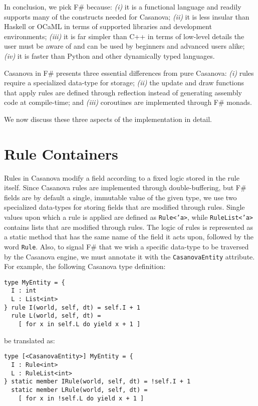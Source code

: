 In conclusion, we pick F\# because: \textit{(i)} it is a functional language and readily supports many of the constructs needed for Casanova; \textit{(ii)} it is less insular than Haskell or OCaML in terms of supported libraries and development environments; \textit{(iii)} it is far simpler than C++ in terms of low-level details the user must be aware of and can be used by beginners and advanced users alike; \textit{(iv)} it is faster than Python and other dynamically typed languages.

Casanova in F\# presents three essential differences from pure Casanova: \textit{(i)} rules require a specialized data-type for storage; \textit{(ii)} the update and draw functions that apply rules are defined through reflection instead of generating assembly code at compile-time; and \textit{(iii)} coroutines are implemented through F\# monads.

We now discuss these three aspects of the implementation in detail.

\section{Rule Containers}
Rules in Casanova modify a field according to a fixed logic stored in the rule itself. Since Casanova rules are implemented through double-buffering, but F\# fields are by default a single, immutable value of the given type, we use two specialized data-types for storing fields that are modified through rules. Single values upon which a rule is applied are defined as \texttt{Rule<'a>}, while \texttt{RuleList<'a>} contains lists that are modified through rules. The logic of rules is represented as a static method that has the same name of the field it acts upon, followed by the word \texttt{Rule}. Also, to signal F\# that we wish a specific data-type to be traversed by the Casanova engine, we must annotate it with the \texttt{CasanovaEntity} attribute. For example, the following Casanova type definition:

\begin{lstlisting}
type MyEntity = {
  I : int
  L : List<int>
} rule I(world, self, dt) = self.I + 1
  rule L(world, self, dt) = 
    [ for x in self.L do yield x + 1 ]
\end{lstlisting}

 be translated as:

\begin{lstlisting}
type [<CasanovaEntity>] MyEntity = {
  I : Rule<int>
  L : RuleList<int>
} static member IRule(world, self, dt) = !self.I + 1
  static member LRule(world, self, dt) = 
    [ for x in !self.L do yield x + 1 ]
\end{lstlisting}


